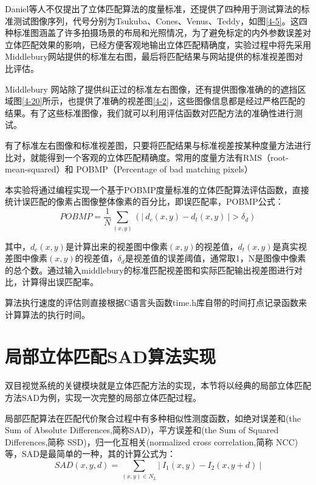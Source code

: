 Daniel等人不仅提出了立体匹配算法的度量标准，还提供了四种用于测试算法的标准测试图像序列，代号分别为Tsukuba、Cones、Venus、Teddy，如图\ref{4-5}。这四种标准图涵盖了许多拍摄场景的布局和光照情况，为了避免标定的内外参数误差对立体匹配效果的影响，已经方便客观地输出立体匹配精确度，实验过程中将先采用Middlebury网站提供的标准左右图，最后将匹配结果与网站提供的标准视差图对比评估。


Middlebury 网站除了提供纠正过的标准左右图像，还有提供图像准确的的遮挡区域图\ref{4-20}所示，也提供了准确的视差图\ref{4-2}，这些图像信息都是经过严格匹配的结果。有了这些标准图像，我们就可以利用评估函数对匹配方法的准确性进行测试。


有了标准左右图像和标准视差图，只要将匹配结果与标准视差按某种度量方法进行比对，就能得到一个客观的立体匹配精确度。常用的度量方法有RMS（root-mean-squared）和 POBMP（Percentage of bad matching pixels）

本实验将通过编程实现一个基于POBMP度量标准的立体匹配算法评估函数，直接统计误匹配的像素占图像整体像素的百分比，即误匹配率，POBMP公式：
\begin{equation}
POBMP=\frac{1}{N}\sum_{(x,y)} (|\ d_{c}(x,y)-d_{t}(x,y)\ |>\delta _{d})
\end{equation}

其中，$d_{c}(x,y)$是计算出来的视差图中像素$(x,y)$的视差值，$d_{t}(x,y)$是真实视差图中像素$(x,y)$的视差值，$\delta _{d}$是视差值的误差阈值，通常取1，N是图像中像素的总个数。通过输入middlebury的标准匹配视差图和实际匹配输出视差图进行对比，计算得出误匹配率。

算法执行速度的评估则直接根据C语言头函数time.h库自带的时间打点记录函数来计算算法的执行时间。

\section{局部立体匹配SAD算法实现}

双目视觉系统的关键模块就是立体匹配方法的实现，本节将以经典的局部立体匹配方法SAD为例，实现一次完整的局部立体匹配过程。


局部匹配算法在匹配代价聚合过程中有多种相似性测度函数，如绝对误差和(the Sum of Absolute Differences,简称SAD)，平方误差和(the Sum of Squared Differences,简称 SSD)，归一化互相关(normalized cross correlation,简称 NCC)等，SAD是最简单的一种，其的计算公式为：
\begin{equation}
SAD(x,y,d)=\sum_{(x,y)\in N_{L}} |\ I_{1}(x,y)-I_{2}(x,y+d) \ |
\end{equation}

